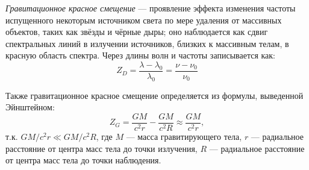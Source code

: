 \textit{Гравитационное красное смещение} --- проявление эффекта изменения частоты испущенного некоторым источником света по мере удаления от массивных объектов, таких как звёзды и чёрные дыры; оно наблюдается как сдвиг спектральных линий в излучении источников, близких к массивным телам, в красную область спектра. Через длины волн и частоты записывается как:
\begin{equation}
Z_D=\frac{\lambda-\lambda_0}{\lambda_0}=\frac{\nu-\nu_0}{\nu_0}
\end{equation}

Также гравитационное красное смещение определяется из формулы, выведенной Эйнштейном:
\begin{equation}
Z_G=\frac{GM}{c^2r}-\frac{GM}{c^2R}\approx\frac{GM}{c^2r}, 
\end{equation}
т.к. $GM/c^2r\ll GM/c^2R$, где $M$ --- масса гравитирующего тела, $r$ --- радиальное расстояние от центра масс тела до точки излучения, $R$ ---  радиальное расстояние от центра масс тела до точки наблюдения.
